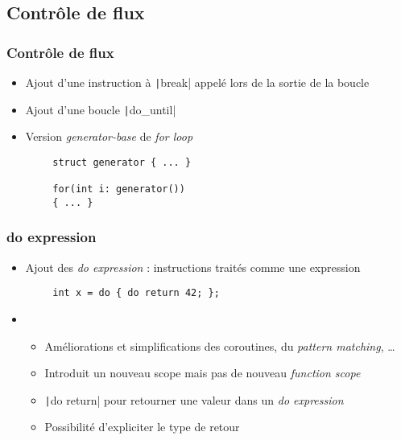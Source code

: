 \documentclass[C++.tex]{subfiles}
\begin{document}
\subsection*{Contrôle de flux}
\begin{frame}[fragile]
	\frametitle{Contrôle de flux}
	\begin{itemize}
		\item Ajout d'une instruction à \texttt|break| appelé lors de la sortie de la boucle


		\item Ajout d'une boucle \texttt|do_until|
		\item Version \textit{generator-base} de \textit{for loop}
	\end{itemize}

	\begin{verbatim}
		struct generator { ... }

		for(int i: generator())
		{ ... }
	\end{verbatim}

\end{frame}

\begin{frame}[fragile]
	\frametitle{do expression}
	\begin{itemize}
		\item Ajout des \og{}\textit{do expression}\fg{} : instructions traités comme une expression
	\end{itemize}

	\begin{verbatim}
		int x = do { do return 42; };
	\end{verbatim}

	\begin{itemize}
		\item[]
		\begin{itemize}
			\item Améliorations et simplifications des coroutines, du \textit{pattern matching}, \ldots{}
			\item Introduit un nouveau scope mais pas de nouveau \textit{function scope}
			\item \texttt|do return| pour retourner une valeur dans un \textit{do expression}
			\item Possibilité d'expliciter le type de retour
		\end{itemize}
	\end{itemize}

\end{frame}
\end{document}
